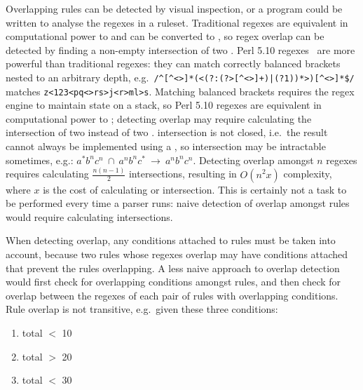 Overlapping rules can be detected by visual inspection, or a program could
be written to analyse the regexes in a ruleset.  Traditional regexes are
equivalent in computational power to  and can be converted to
, so regex overlap can be detected by finding a non-empty
intersection of two \@.  Perl 5.10 regexes~\cite{perlre} are
more powerful than traditional regexes: they can match correctly balanced
brackets nested to an arbitrary depth, e.g.\
\verb!/^[^<>]*(<(?:(?>[^<>]+)|(?1))*>)[^<>]*$/!  matches
\verb!z<123<pq<>rs>j<r>ml>s!.  Matching balanced brackets requires the
regex engine to maintain state on a stack, so Perl 5.10 regexes are
equivalent in computational power to ; detecting overlap may
require calculating the intersection of two  instead of two
\acronym{FA}.   intersection is not closed, i.e.\ the result
cannot always be implemented using a \acronym{PDA}, so intersection may be
intractable sometimes, e.g.:
$a^{*}b^{n}c^{n}~\cap~a^{n}b^{n}c^{*}~\rightarrow~a^{n}b^{n}c^{n}$.
Detecting overlap amongst $n$ regexes requires calculating
$\frac{n\left(n-1\right)}{2}$ intersections, resulting in
$O\left(n^{2}x\right)$ complexity, where $x$ is the cost of calculating
\acronym{FA} or \acronym{PDA} intersection.  This is certainly not a task
to be performed every time a parser runs: naive detection of overlap
amongst \parsernames{} \numberOFrules{} rules would require calculating
\numberOFruleINTERSECTIONS{} intersections.

When detecting overlap, any conditions attached to rules must be taken into
account, because two rules whose regexes overlap may have conditions
attached that prevent the rules overlapping.  A less naive approach to
overlap detection would first check for overlapping conditions amongst
rules, and then check for overlap between the regexes of each pair of rules
with overlapping conditions.  Rule overlap is not transitive, e.g.\ given
these three conditions:

\begin{enumerate}

    \squeezeitems{}

    \item total $<$ 10

    \item total $>$ 20

    \item total $<$ 30

\end{enumerate}

